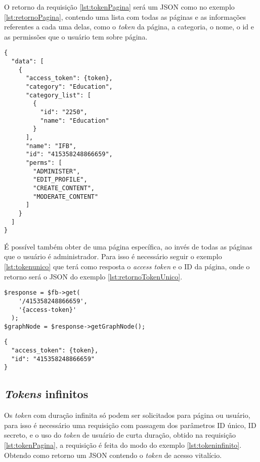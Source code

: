 O retorno da requisição \ref{lst:tokenPagina} será um JSON como no exemplo \ref{lst:retornoPagina}, contendo uma lista com todas as páginas e as informações referentes a cada uma delas, como o \textit{token} da página, a categoria, o nome, o id e as permissões que o usuário tem sobre página. 

\begin{lstlisting}[caption={Retorno \textit{token de acesso de página \ref{lst:tokenPagina}}},label={lst:retornoPagina}]
{
  "data": [
    {
      "access_token": {token},
      "category": "Education",
      "category_list": [
        {
          "id": "2250",
          "name": "Education"
        }
      ],
      "name": "IFB",
      "id": "415358248866659",
      "perms": [
        "ADMINISTER",
        "EDIT_PROFILE",
        "CREATE_CONTENT",
        "MODERATE_CONTENT"
      ]
    }
  ]
}
\end{lstlisting}

É possível também obter de uma página específica, ao invés de todas as páginas que o usuário é administrador. Para isso é necessário seguir o exemplo \ref{lst:tokenunico} que terá como resposta o \textit{access token} e o ID da página, onde o retorno será o JSON do exemplo \ref{lst:retornoTokenUnico}.

\begin{lstlisting}[caption={Obtendo Token de uma única página},label={lst:tokenunico}]
  $response = $fb->get(
    '/415358248866659',
    '{access-token}'
  );
$graphNode = $response->getGraphNode();
\end{lstlisting}

\begin{lstlisting}[caption={Retorno \textit{token} de uma única página específica},label={lst:retornoTokenunico}]
{
  "access_token": {token},
  "id": "415358248866659"
}
\end{lstlisting}


\subsection{\textit{Tokens} infinitos}
Os \textit{token} com duração infinita só podem ser solicitados para página ou usuário, para isso é necessário uma requisição com passagem dos parâmetros ID único, ID secreto, e o uso do \textit{token} de usuário de curta duração, obtido na requisição \ref{lst:tokenPagina}, a requisição é feita do modo do exemplo \ref{lst:tokeninfinito}. Obtendo como retorno um JSON contendo o \textit{token} de acesso vitalício.


